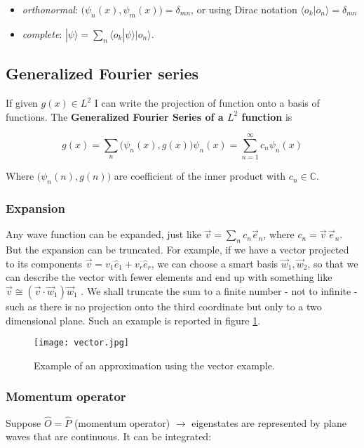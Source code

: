 	\begin{multicols}{2}
		\begin{itemize}
		\item \textit{orthonormal}: $\bigl(\psi_n(x),\psi_m(x)\bigr)=\delta_{mn}$, or using Dirac notation $\langle o_k|o_n \rangle = \delta_{mn}$
		\item \textit{complete}: $ | \psi \rangle = \sum_n \langle o_k | \psi \rangle |o_n \rangle$.
		\end{itemize}
	\end{multicols}

	\subsection{Generalized Fourier series}
	If given $g(x)\in L^2$ I can write the projection of function onto a basis of functions.
	The \textbf{Generalized Fourier Series of a $L^2$ function} is

	$$g(x)=\sum_{n}\bigl(\psi_n(x),g(x)\bigr)\psi_n(x) =\sum_{n=1}^{\infty}c_n\psi_n(x)$$

	Where $\bigl(\psi_n(n),g(n)\bigr)$ are coefficient of the inner product with $c_n\in \mathbb{C}$.

		\subsubsection{Expansion}

		Any wave function can be expanded, just like $\vec{v} = \sum_n c_n \vec{e}_n$, where $c_n = \vec{v} \, \vec{e}_n$.
		But the expansion can be truncated.
		For example, if we have a vector projected to its components $\vec v = v_1\hat{e}_1+v_r\hat{e}_r$, we can choose a smart basis ${\vec{w}_1, \vec{w}_2}$, so that we can describe the vector with fewer elements and end up with something like $ \vec{v} \cong (\vec{v} \cdot \vec{w}_1) \vec{w}_1 $ .
		We shall truncate the sum to a finite number - not to infinite - such as there is no projection onto the third coordinate but only to a two dimensional plane. Such an example is reported in figure \ref{fig:vector}.
	\begin{figure}[htbp!]
    \centering
    \texttt{[image: vector.jpg]}
    \caption{Example of an approximation using the vector example.}
    \label{fig:vector}
\end{figure}
		\subsubsection{Momentum operator}
		Suppose $\hat{O}=\hat{P}$ (momentum operator) $\rightarrow$ eigenstates are represented by plane waves that are continuous.
		It can be integrated:

